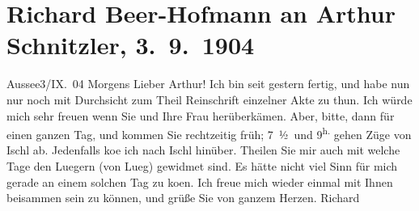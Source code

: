 

         
         \renewcommand{\erwaehntePersonen}{Personen: Richard Beer-Hofmann, Olga Schnitzler}
         \renewcommand{\erwaehnteOrte}{Orte: Bad Aussee, Bad Ischl, Lueg am Wolfgangsee}
         \renewcommand{\erwaehnteWerke}{Werke: Der Graf von Charolais. Ein Trauerspiel}
               \section[Richard Beer-Hofmann an Arthur Schnitzler, 3. 9. 1904]{ Richard Beer-Hofmann an Arthur Schnitzler, 3. 9. 1904}\nopagebreak{}\rehead{ }\begin{ledgroupsized}[t]{13cm}\normalsize\beginnumbering \toendnotes[C]{\smallbreak\pagebreak[2]} 
\toendnotes[C]{\smallbreak}\pstart
           \centering{}{\pb}Aussee3/IX. 04{ }Morgens\pend
           \pstart
           Lieber Arthur! Ich bin seit gestern fertig, und habe nun nur noch
               mit Durchsicht zum Theil Reinschrift einzelner Akte zu thun. Ich würde mich sehr freuen wenn Sie und Ihre
                  Frau herüberkämen. Aber, bitte, dann für
               einen ganzen Tag, und kommen Sie rechtzeitig früh; 7 ½ und 9\textsuperscript{h.} gehen Züge von Ischl ab. Jedenfalls ko{\geminationm}e ich nach Ischl
               hinüber. Theilen Sie mir auch mit welche Tage den Luegern (von Lueg) gewidmet sind. Es
               hätte nicht viel Sinn für mich gerade an einem solchen Tag zu ko{\geminationm}en.\pend
           \pstart
           Ich freue mich wieder einmal mit Ihnen beisammen sein zu können, und grüße Sie von
               ganzem Herzen.\pend
           \pstart \spacefill\mbox{Richard}\pend{}
         
         \endnumbering{}\end{ledgroupsized}  \newcommand{\dateiname}{L01434}\newcommand{\titel}{Richard Beer-Hofmann an Arthur Schnitzler, 3. 9. 1904}\newcommand{\editorInnen}{Martin Anton Müller und Gerd-Hermann Susen}
      